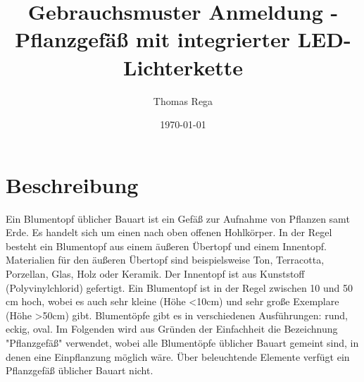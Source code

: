 \documentclass[ngerman, 12pt, a4paper]{scrartcl}
\title{Gebrauchsmuster Anmeldung - Pflanzgefäß mit integrierter LED-Lichterkette}
\author{Thomas Rega}
\date{\today}
\begin{document}
\maketitle



\section*{Beschreibung}
Ein Blumentopf üblicher Bauart ist ein Gefäß zur Aufnahme von Pflanzen samt Erde. Es handelt
sich um einen nach oben offenen Hohlkörper. In der Regel besteht ein Blumentopf aus einem
äußeren Übertopf und einem Innentopf. Materialien für den äußeren Übertopf sind beispielsweise Ton,
Terracotta, Porzellan, Glas, Holz oder Keramik. Der Innentopf ist aus Kunststoff (Polyvinylchlorid)
gefertigt.  Ein Blumentopf ist in der Regel zwischen 10 und 50 cm hoch, wobei es auch sehr kleine
(Höhe \textless 10cm) und sehr große Exemplare (Höhe \textgreater 50cm) gibt.
Blumentöpfe gibt es in verschiedenen Ausführungen: rund, eckig, oval. Im Folgenden wird aus Gründen
der Einfachheit die Bezeichnung "Pflanzgefäß" verwendet, wobei alle Blumentöpfe üblicher Bauart
gemeint sind, in denen eine Einpflanzung möglich wäre. Über beleuchtende Elemente verfügt ein
Pflanzgefäß üblicher Bauart nicht.\newline
\end{document}
